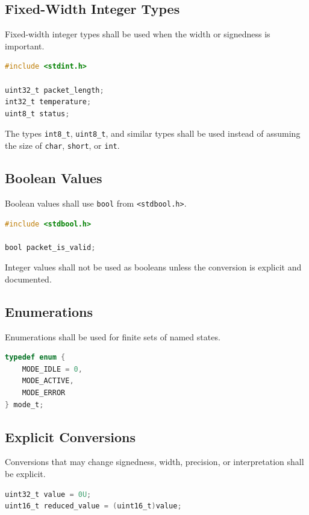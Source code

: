 \subsection{Fixed-Width Integer Types}

Fixed-width integer types shall be used when the width or signedness is important.

\begin{lstlisting}[language=C]
#include <stdint.h>

uint32_t packet_length;
int32_t temperature;
uint8_t status;
\end{lstlisting}

The types \texttt{int8\_t}, \texttt{uint8\_t}, and similar types shall be used instead of assuming the size of \texttt{char}, \texttt{short}, or \texttt{int}.

\subsection{Boolean Values}

Boolean values shall use \texttt{bool} from \texttt{<stdbool.h>}.

\begin{lstlisting}[language=C]
#include <stdbool.h>

bool packet_is_valid;
\end{lstlisting}

Integer values shall not be used as booleans unless the conversion is explicit and documented.

\subsection{Enumerations}

Enumerations shall be used for finite sets of named states.

\begin{lstlisting}[language=C]
typedef enum {
	MODE_IDLE = 0,
	MODE_ACTIVE,
	MODE_ERROR
} mode_t;
\end{lstlisting}

\subsection{Explicit Conversions}

Conversions that may change signedness, width, precision, or interpretation shall be explicit.

\begin{lstlisting}[language=C]
uint32_t value = 0U;
uint16_t reduced_value = (uint16_t)value;
\end{lstlisting}

